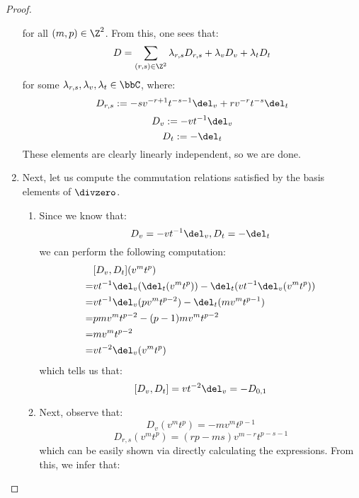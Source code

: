 \begin{proof}
\begin{enumerate}
$$                        $$
                    for all $(m, p) \in \Z^2$. From this, one sees that:
                        $$D = \sum_{(r, s) \in \Z^2} \lambda_{r, s} D_{r, s} + \lambda_v D_v + \lambda_t D_t$$
                    for some $\lambda_{r, s}, \lambda_v, \lambda_t \in \bbC$, where:
                        $$D_{r, s} := -s v^{-r + 1} t^{-s - 1} \del_v + r v^{-r} t^{-s} \del_t$$
                        $$D_v := -v t^{-1} \del_v$$
                        $$D_t := -\del_t$$
                    These elements are clearly linearly independent, so we are done.
                    \item Next, let us compute the commutation relations satisfied by the basis elements of $\divzero$.
                    \begin{enumerate}
                        \item Since we know that:
                            $$D_v = -vt^{-1} \del_v, D_t = -\del_t$$
                        we can perform the following computation:
                            $$
                                \begin{aligned}
                                    & [D_v, D_t](v^m t^p)
                                    \\
                                    = & v t^{-1} \del_v( \del_t (v^m t^p) ) - \del_t ( v t^{-1} \del_v ( v^m t^p ) )
                                    \\
                                    = & v t^{-1} \del_v( p v^m t^{p - 2} ) - \del_t ( mv^m t^{p - 1} )
                                    \\
                                    = & p m v^m t^{p - 2} - (p - 1) m v^m t^{p - 2}
                                    \\
                                    = & m v^m t^{p - 2}
                                    \\
                                    = & v t^{-2} \del_v( v^m t^p ) 
                                \end{aligned}
                            $$
                        which tells us that:
                            $$[D_v, D_t] = v t^{-2} \del_v = -D_{0, 1}$$
                        \item Next, observe that:
                            $$D_v(v^m t^p) = -m v^m t^{p - 1}$$
                            $$D_{r, s}(v^m t^p) = ( rp - ms ) v^{m - r} t^{p - s - 1}$$
                        which can be easily shown via directly calculating the expressions. From this, we infer that:

\end{enumerate}
\end{enumerate}
\end{proof}
